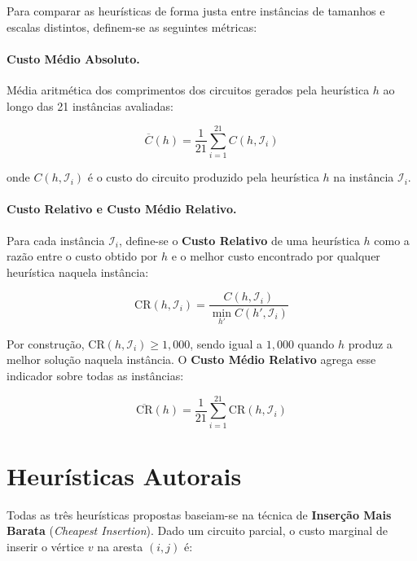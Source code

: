 \documentclass[12pt, a4paper]{article}
\begin{document}
Para comparar as heurísticas de forma justa entre instâncias de tamanhos e escalas
distintos, definem-se as seguintes métricas:

\paragraph{Custo Médio Absoluto.}
Média aritmética dos comprimentos dos circuitos gerados pela heurística $h$ ao longo das
21 instâncias avaliadas:

\begin{equation}
    \overline{C}(h) = \frac{1}{21} \sum_{i=1}^{21} C(h, \mathcal{I}_i)
\end{equation}

\noindent onde $C(h, \mathcal{I}_i)$ é o custo do circuito produzido pela heurística $h$
na instância $\mathcal{I}_i$.

\paragraph{Custo Relativo e Custo Médio Relativo.}
Para cada instância $\mathcal{I}_i$, define-se o \textbf{Custo Relativo} de uma
heurística $h$ como a razão entre o custo obtido por $h$ e o melhor custo encontrado
por qualquer heurística naquela instância:

\begin{equation}
    \mathrm{CR}(h, \mathcal{I}_i)
    = \frac{C(h, \mathcal{I}_i)}{\displaystyle\min_{h'} C(h', \mathcal{I}_i)}
\end{equation}

\noindent Por construção, $\mathrm{CR}(h, \mathcal{I}_i) \geq 1{,}000$, sendo igual a
$1{,}000$ quando $h$ produz a melhor solução naquela instância. O \textbf{Custo Médio
Relativo} agrega esse indicador sobre todas as instâncias:

\begin{equation}
    \overline{\mathrm{CR}}(h)
    = \frac{1}{21} \sum_{i=1}^{21} \mathrm{CR}(h, \mathcal{I}_i)
\end{equation}

\section{Heurísticas Autorais}

Todas as três heurísticas propostas baseiam-se na técnica de
\textbf{Inserção Mais Barata} (\textit{Cheapest Insertion}). Dado um circuito parcial,
o custo marginal de inserir o vértice $v$ na aresta $(i,j)$ é:
\end{document}
